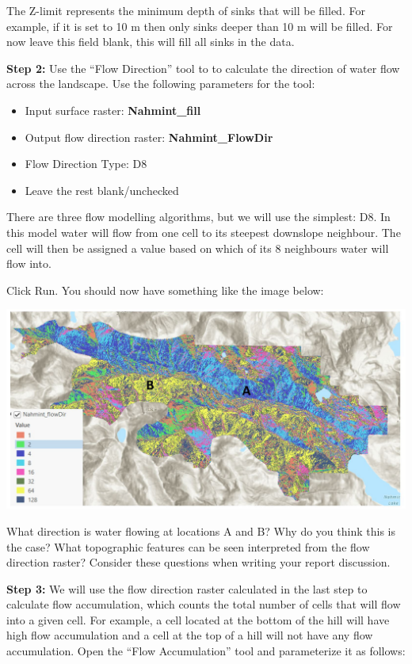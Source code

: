 \documentclass[
]{book}
\providecommand{\tightlist}{%
  \setlength{\itemsep}{0pt}\setlength{\parskip}{0pt}}
\begin{document}
The Z-limit represents the minimum depth of sinks that will be filled. For example, if it is set to 10 m then only sinks deeper than 10 m will be filled. For now leave this field blank, this will fill all sinks in the data.

\textbf{Step 2:} Use the ``Flow Direction'' tool to to calculate the direction of water flow across the landscape. Use the following parameters for the tool:

\begin{itemize}
\tightlist
\item
  Input surface raster: \textbf{Nahmint\_fill}
\item
  Output flow direction raster: \textbf{Nahmint\_FlowDir}
\item
  Flow Direction Type: D8
\item
  Leave the rest blank/unchecked
\end{itemize}

There are three flow modelling algorithms, but we will use the simplest: D8. In this model water will flow from one cell to its steepest downslope neighbour. The cell will then be assigned a value based on which of its 8 neighbours water will flow into.

Click Run. You should now have something like the image below:

\includegraphics[width=0.75\linewidth]{images/03-flow-direction}

What direction is water flowing at locations A and B? Why do you think this is the case? What topographic features can be seen interpreted from the flow direction raster? Consider these questions when writing your report discussion.

\textbf{Step 3:} We will use the flow direction raster calculated in the last step to calculate flow accumulation, which counts the total number of cells that will flow into a given cell. For example, a cell located at the bottom of the hill will have high flow accumulation and a cell at the top of a hill will not have any flow accumulation. Open the ``Flow Accumulation'' tool and parameterize it as follows:
\end{document}

